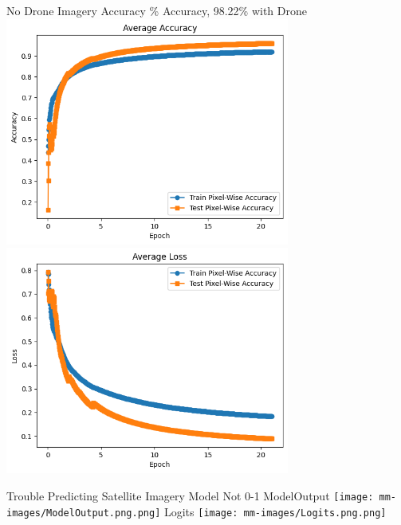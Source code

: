 \begin{frame}{No Drone Imagery Accuracy}
    \% Accuracy, 98.22\% with Drone
    \includegraphics[height=0.7\textheight,width=0.7\textwidth,keepaspectratio]{mm-images/AvgAcc.png}
    \includegraphics[height=0.7\textheight,width=0.7\textwidth,keepaspectratio]{mm-images/AvgLoss.png}
\end{frame}
\begin{frame}{Trouble Predicting Satellite Imagery}
    \centering
    Model Not 0-1
    ModelOutput
    \texttt{[image: mm-images/ModelOutput.png.png]}
    Logits
    \texttt{[image: mm-images/Logits.png.png]}
\end{frame}
